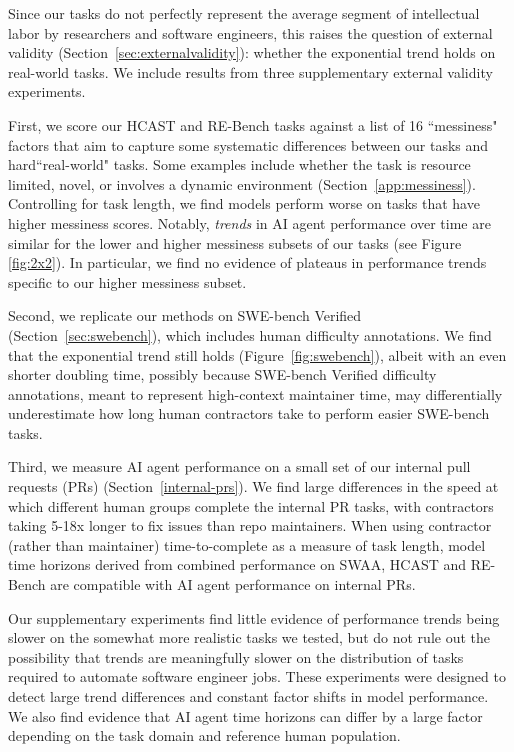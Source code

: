 \documentclass{article}
\newcommand{\gabenchmark}{HCAST}
\begin{document}
Since our tasks do not perfectly represent the average segment of intellectual labor by researchers and software engineers, this raises the question of external validity (Section~\ref{sec:externalvalidity}): whether the exponential trend holds on real-world tasks. We include results from three supplementary external validity experiments.


First, we score our \gabenchmark{} and RE-Bench tasks against a list of 16 ``messiness" factors that aim to capture some systematic differences between our tasks and hard``real-world" tasks. Some examples include whether the task is resource limited, novel, or involves a dynamic environment (Section~\ref{app:messiness}). Controlling for task length, we find models perform worse on tasks that have higher messiness scores. Notably, \textit{trends} in AI agent performance over time are similar for the lower and higher messiness subsets of our tasks (see Figure \ref{fig:2x2}). In particular, we find no evidence of plateaus in performance trends specific to our higher messiness subset. 

Second, we replicate our methods on SWE-bench Verified (Section~\ref{sec:swebench}), which includes human difficulty annotations. 
We find that the exponential trend still holds (Figure~\ref{fig:swebench}), albeit with an even shorter doubling time, possibly because SWE-bench Verified difficulty annotations, meant to represent high-context maintainer time, may differentially underestimate how long human contractors take to perform easier SWE-bench tasks.

Third, we measure AI agent performance on a small set of our internal pull requests (PRs) (Section~\ref{internal-prs}). We find large differences in the speed at which different human groups complete the internal PR tasks, with contractors taking 5-18x longer to fix issues than repo maintainers. When using contractor (rather than maintainer) time-to-complete as a measure of task length, model time horizons derived from combined performance on SWAA, \gabenchmark{} and RE-Bench are compatible with AI agent performance on internal PRs.

Our supplementary experiments find little evidence of performance trends being slower on the somewhat more realistic tasks we tested, but do not rule out the possibility that trends are meaningfully slower on the distribution of tasks required to automate software engineer jobs. These experiments were designed to detect large trend differences and constant factor shifts in model performance. We also find evidence that AI agent time horizons can differ by a large factor depending on the task domain and reference human population.
\end{document}
